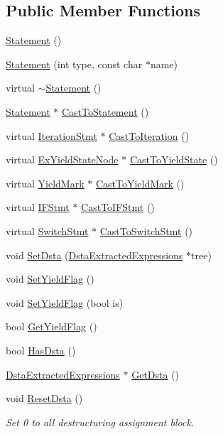 \subsection*{Public Member Functions}
\begin{DoxyCompactItemize}
\item 
\hyperlink{classmocha_1_1_statement_a61bc5bf1a118bb5c6288c85848b9ee48}{Statement} ()
\item 
\hyperlink{classmocha_1_1_statement_ac8a40a3520bb29ebb20364875d01ffff}{Statement} (int type, const char $\ast$name)
\item 
virtual \hyperlink{classmocha_1_1_statement_ad806a006f7e2cb8f1ececdfa5c5151fe}{$\sim$Statement} ()
\item 
\hyperlink{classmocha_1_1_statement}{Statement} $\ast$ \hyperlink{classmocha_1_1_statement_a91d52b61a590207efa749d623094543c}{CastToStatement} ()
\item 
virtual \hyperlink{classmocha_1_1_iteration_stmt}{IterationStmt} $\ast$ \hyperlink{classmocha_1_1_statement_a7f26b035f4e7504e6c6ca6fca280e636}{CastToIteration} ()
\item 
virtual \hyperlink{classmocha_1_1_ex_yield_state_node}{ExYieldStateNode} $\ast$ \hyperlink{classmocha_1_1_statement_a21dd7e1d946eae1ab31113d2adc79110}{CastToYieldState} ()
\item 
virtual \hyperlink{classmocha_1_1_yield_mark}{YieldMark} $\ast$ \hyperlink{classmocha_1_1_statement_a403ef1401f09802c177f269ba0225f7c}{CastToYieldMark} ()
\item 
virtual \hyperlink{classmocha_1_1_i_f_stmt}{IFStmt} $\ast$ \hyperlink{classmocha_1_1_statement_a8a2c083af282392e417e367fa1ac3938}{CastToIFStmt} ()
\item 
virtual \hyperlink{classmocha_1_1_switch_stmt}{SwitchStmt} $\ast$ \hyperlink{classmocha_1_1_statement_a1961e09139861be2276552f41917e447}{CastToSwitchStmt} ()
\item 
void \hyperlink{classmocha_1_1_statement_aff56aa2480452a15ad08f3b70e75ff88}{SetDsta} (\hyperlink{classmocha_1_1_dsta_extracted_expressions}{DstaExtractedExpressions} $\ast$tree)
\item 
void \hyperlink{classmocha_1_1_statement_a3da2b32930da12e1ab1db145951e6d79}{SetYieldFlag} ()
\item 
void \hyperlink{classmocha_1_1_statement_a16b3dbc1ece47df34f9739d67e196a7c}{SetYieldFlag} (bool is)
\item 
bool \hyperlink{classmocha_1_1_statement_aebf68628d0df1aa896796b244b551067}{GetYieldFlag} ()
\item 
bool \hyperlink{classmocha_1_1_statement_a348f368ee5c22018059510067ceeaead}{HasDsta} ()
\item 
\hyperlink{classmocha_1_1_dsta_extracted_expressions}{DstaExtractedExpressions} $\ast$ \hyperlink{classmocha_1_1_statement_ae1802b82da424cefda6c890563ff2e11}{GetDsta} ()
\item 
void \hyperlink{classmocha_1_1_statement_af5e7c55d555f43d60d831af659224d0f}{ResetDsta} ()
\begin{DoxyCompactList}\small\item\em Set 0 to all destructuring assignment block. \end{DoxyCompactList}\end{DoxyCompactItemize}
